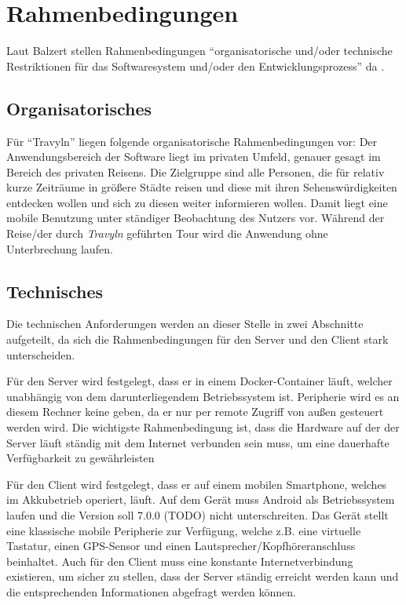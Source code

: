 \section{Rahmenbedingungen}
Laut Balzert stellen Rahmenbedingungen \enquote{organisatorische und/oder technische Restriktionen für das Softwaresystem und/oder den Entwicklungsprozess} da \cite{Balzert.2009}.

\subsection{Organisatorisches}
Für \enquote{Travyln} liegen folgende organisatorische Rahmenbedingungen vor: Der Anwendungsbereich der Software liegt im privaten Umfeld, genauer gesagt im Bereich des privaten Reisens. Die Zielgruppe sind alle Personen, die für relativ kurze Zeiträume in größere Städte reisen und diese mit ihren Sehenswürdigkeiten entdecken wollen und sich zu diesen weiter informieren wollen. Damit liegt eine mobile Benutzung unter ständiger Beobachtung des Nutzers vor. Während der Reise/der durch \textit{Travyln} geführten Tour wird die Anwendung ohne Unterbrechung laufen.

\subsection{Technisches}

Die technischen Anforderungen werden an dieser Stelle in zwei Abschnitte aufgeteilt, da sich die Rahmenbedingungen für den Server und den Client stark unterscheiden. 

\vspace{0.25cm}

Für den Server wird festgelegt, dass er in einem Docker-Container\cite{Turnbull.2014} läuft, welcher unabhängig von dem darunterliegendem Betriebssystem ist. Peripherie wird es an diesem Rechner keine geben, da er nur per remote Zugriff von außen gesteuert werden wird. Die wichtigste Rahmenbedingung ist, dass die Hardware auf der der Server läuft ständig mit dem Internet verbunden sein muss, um eine dauerhafte Verfügbarkeit zu gewährleisten

\vspace{0.25cm}

Für den Client wird festgelegt, dass er auf einem mobilen Smartphone, welches im Akkubetrieb operiert, läuft. Auf dem Gerät muss Android als Betriebssystem laufen und die Version soll 7.0.0 (TODO) nicht unterschreiten. Das Gerät stellt eine klassische mobile Peripherie zur Verfügung, welche z.B. eine virtuelle Tastatur, einen GPS-Sensor und einen Lautsprecher/Kopfhöreranschluss beinhaltet. Auch für den Client muss eine konstante Internetverbindung existieren, um sicher zu stellen, dass der Server ständig erreicht werden kann und die entsprechenden Informationen abgefragt werden können.

